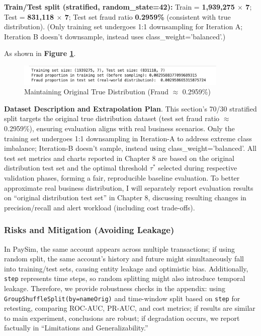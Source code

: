 \documentclass[sigplan,screen]{acmart}
\begin{document}
\textbf{Train/Test split (stratified, random\_state=42):} Train = \textbf{1,939,275 $\times$ 7}; Test = \textbf{831,118 $\times$ 7}; Test set fraud ratio \textbf{0.2959\%} (consistent with true distribution). (Only training set undergoes 1:1 downsampling for Iteration A; Iteration B doesn't downsample, instead uses class\_weight='balanced'.)

As shown in \textbf{Figure \ref{fig:train_test_distribution}}.

\begin{figure}[h!]
    \centering
    \includegraphics[width=0.9\textwidth]{7.1.png}
    \caption{Maintaining Original True Distribution (Fraud $\approx$ 0.2959\%)}
    \label{fig:train_test_distribution}
\end{figure}

\textbf{Dataset Description and Extrapolation Plan}. This section's 70/30 stratified split targets the original true distribution dataset (test set fraud ratio $\approx$ 0.2959\%), ensuring evaluation aligns with real business scenarios. Only the training set undergoes 1:1 downsampling in Iteration-A to address extreme class imbalance; Iteration-B doesn't sample, instead using class\_weight='balanced'. All test set metrics and charts reported in Chapter 8 are based on the original distribution test set and the optimal threshold $\tau^*$ selected during respective validation phases, forming a fair, reproducible baseline evaluation. To better approximate real business distribution, I will separately report evaluation results on ``original distribution test set'' in Chapter 8, discussing resulting changes in precision/recall and alert workload (including cost trade-offs).

\subsubsection{Risks and Mitigation (Avoiding Leakage)}

In PaySim, the same account appears across multiple transactions; if using random split, the same account's history and future might simultaneously fall into training/test sets, causing entity leakage and optimistic bias. Additionally, \texttt{step} represents time steps, so random splitting might also introduce temporal leakage. Therefore, we provide robustness checks in the appendix: using \texttt{GroupShuffleSplit(by=nameOrig)} and time-window split based on \texttt{step} for retesting, comparing ROC-AUC, PR-AUC, and cost metrics; if results are similar to main experiment, conclusions are robust; if degradation occurs, we report factually in ``Limitations and Generalizability.''
\end{document}

